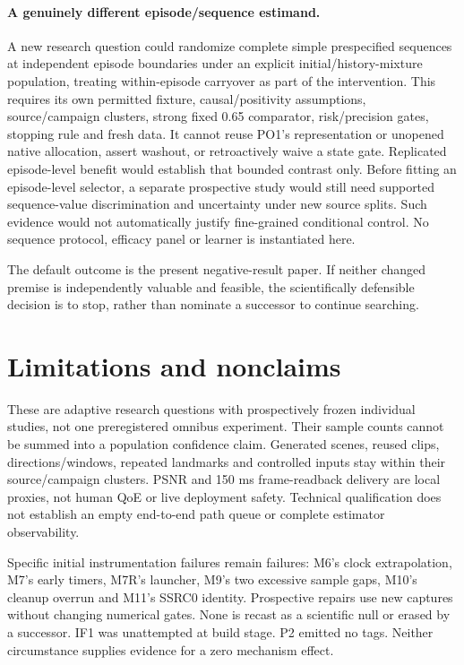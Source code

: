 \documentclass[10pt]{article}
\begin{document}
\paragraph{A genuinely different episode/sequence estimand.}
A new research question could randomize complete simple prespecified sequences
at independent episode boundaries under an explicit initial/history-mixture
population, treating within-episode carryover as part of the intervention.
This requires its own permitted fixture, causal/positivity assumptions,
source/campaign clusters, strong fixed 0.65 comparator, risk/precision gates,
stopping rule and fresh data. It cannot reuse PO1's representation or unopened
native allocation, assert washout, or retroactively waive a state gate.
Replicated episode-level benefit would establish that bounded contrast only.
Before fitting an episode-level selector, a separate prospective study would
still need supported sequence-value discrimination and uncertainty under new
source splits. Such evidence would not automatically justify fine-grained
conditional control. No sequence protocol, efficacy panel or learner is
instantiated here.

The default outcome is the present negative-result paper. If neither changed
premise is independently valuable and feasible, the scientifically defensible
decision is to stop, rather than nominate a successor to continue searching.

\section{Limitations and nonclaims}
\label{sec:limits}
These are adaptive research questions with prospectively frozen individual
studies, not one preregistered omnibus experiment. Their sample counts cannot
be summed into a population confidence claim. Generated scenes, reused clips,
directions/windows, repeated landmarks and controlled inputs stay within their
source/campaign clusters. PSNR and 150 ms frame-readback delivery are local
proxies, not human QoE or live deployment safety. Technical qualification does
not establish an empty end-to-end path queue or complete estimator observability.

Specific initial instrumentation failures remain failures: M6's clock
extrapolation, M7's early timers, M7R's launcher, M9's two excessive sample gaps,
M10's cleanup overrun and M11's SSRC0 identity. Prospective repairs use new
captures without changing numerical gates. None is recast as a scientific null
or erased by a successor. IF1 was unattempted at build stage. P2 emitted no tags.
Neither circumstance supplies evidence for a zero mechanism effect.
\end{document}

